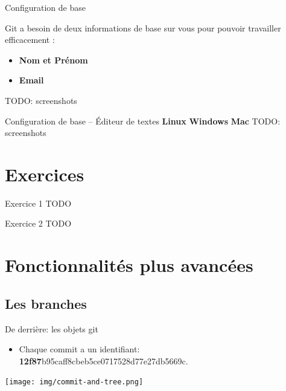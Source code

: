 \documentclass{beamer}
\begin{document}
\begin{frame}{Configuration de base}

Git a besoin de deux informations de base sur vous pour pouvoir travailler
efficacement :

\begin{itemize}
\item \textbf{Nom et Prénom}
\item \textbf{Email}
\end{itemize}
TODO: screenshots

\end{frame}

\begin{frame}{Configuration de base -- Éditeur de textes}
    \textbf{Linux}
    \textbf{Windows}
    \textbf{Mac}
    TODO: screenshots
\end{frame}


\section{Exercices}

\begin{frame}{Exercice 1}
    TODO
\end{frame}

\begin{frame}{Exercice 2}
    TODO
\end{frame}


\section{Fonctionnalités plus avancées}

\subsection{Les branches}

\begin{frame}{De derrière: les objets git}
    \begin{itemize}
        \item Chaque commit a un identifiant: \textbf{12f87}b95caff8cbeb5ce0717528d77e27db5669c.
    \end{itemize}
    \begin{center}
    \texttt{[image: img/commit-and-tree.png]}
    \end{center}
\end{frame}
\end{document}
